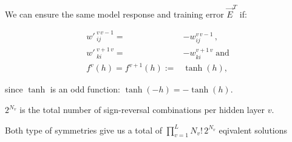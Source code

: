 \begin{frame}\frametitle{\subsecname}


We can ensure the same model response and training error $\vec E^{T}$ if:


\begin{align}
{w'\,}^{v\,v-1}_{ij} =& -w^{v\,v-1}_{ij}\,,\\
{w'\,}^{v+1\,v}_{ki} =& -w^{v+1\,v}_{ki} \; \text{and}\\
f^{v}(h) = f^{v+1}(h) :=& \tanh(h),
\end{align}

since $\tanh$ is an odd function: $\tanh(-h) = -\tanh(h)$.

$2^{N_{v}}$ is the total number of sign-reversal combinations per hidden layer $v$.

Both type of symmetries give us 
a total of $\prod_{v=1}^{L} N_{v}!\, 2^{N_{v}}$ eqivalent solutions

  
\end{frame}

